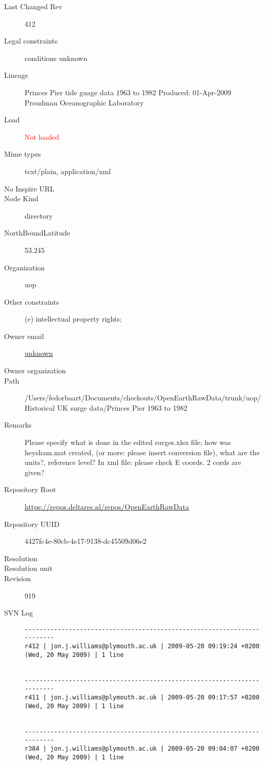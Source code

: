 \documentclass[9]{report}
\begin{document}
\begin{description}
  \item[Last Changed Rev] 412
  \item[Legal constraints] conditions unknown
  \item[Lineage] Princes Pier tide guage data 1963 to 1982
Produced: 01-Apr-2009
Proudman Oceanographic Laboratory
  \item[Load] \textcolor{red}{Not loaded}
  \item[Mime types] text/plain, application/xml
  \item[No Inspire URL] 
  \item[Node Kind] directory
  \item[NorthBoundLatitude] 53.245
  \item[Organization] uop
  \item[Other constraints] (e) intellectual property rights;
  \item[Owner email] \href{mailto:unknown}{unknown}
  \item[Owner organization] 
  \item[Path] /Users/fedorbaart/Documents/checkouts/OpenEarthRawData/trunk/uop/Historical UK surge data/Princes Pier 1963 to 1982
  \item[Remarks] Please specify what is done in the edited surges.xlsx file; how was heysham.mat created, (or more: please insert conversion file), what are the units?, reference level? In xml file: please check E coords. 2 cords are given?
  \item[Repository Root] \href{https://repos.deltares.nl/repos/OpenEarthRawData}{https://repos.deltares.nl/repos/OpenEarthRawData}
  \item[Repository UUID] 4427fc4e-80cb-4e17-9138-dc45509d06e2
  \item[Resolution] 
  \item[Resolution unit] 
  \item[Revision] 919
  \item[SVN Log] \begin{verbatim}
------------------------------------------------------------------------
r412 | jon.j.williams@plymouth.ac.uk | 2009-05-20 09:19:24 +0200 (Wed, 20 May 2009) | 1 line


------------------------------------------------------------------------
r411 | jon.j.williams@plymouth.ac.uk | 2009-05-20 09:17:57 +0200 (Wed, 20 May 2009) | 1 line


------------------------------------------------------------------------
r384 | jon.j.williams@plymouth.ac.uk | 2009-05-20 09:04:07 +0200 (Wed, 20 May 2009) | 1 line



\end{verbatim}
\end{description}
\end{document}
